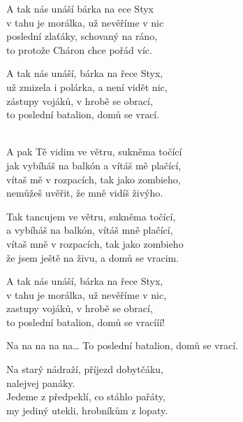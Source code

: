 \ve
A tak nás unáší bárka na ece Styx\\
v tahu je morálka, už nevěříme v nic\\
poslední zlaťáky, schovaný na ráno,\\
to protože Cháron chce pořád víc.
 
\ve
A tak nás unáší, bárka na řece Styx,\\
už zmizela i polárka, a není vidět nic,\\
zástupy vojáků, v hrobě se obrací,\\
to poslední batalion, domů se vrací.
 
 \\
\ve
A pak Tě vidim ve větru, sukněma točící\\
jak vybíháš na balkón a vítáš mě plačící,\\
vítaš mě v rozpacích, tak jako zombieho,\\
nemůžeš uvěřit, že mně vidíš živýho.
 
\ve
Tak tancujem ve větru, sukněma točící,\\
a vybíháš na balkón, vítáš mně plačící,\\
vítaš mně v rozpacích, tak jako zombieho\\
že jsem ještě na živu, a domů se vracim.
 
\ve
A tak nás unáší, bárka na řece Styx,\\
v tahu je morálka, už nevěříme v nic,\\
zastupy vojáků, v hrobě se obrací,\\
to poslední batalion, domů se vracííí!
 
\ve
Na na na na na… To poslední batalion, domů se vrací.
 
\ve
Na starý nádraží, příjezd dobytčáku,\\
nalejvej panáky. \\
Jedeme z předpeklí, co stáhlo pařáty,\\
my jediný utekli, hrobníkům z lopaty.
 
\esong
